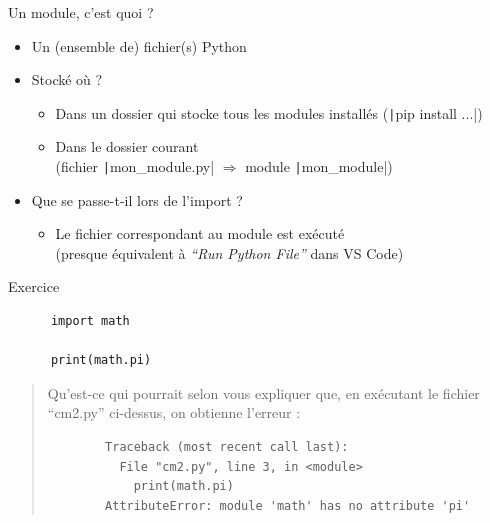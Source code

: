 \documentclass[10pt]{beamer}
\begin{document}
\begin{frame}[fragile]{Un module, c'est quoi ?}
  
  \pause

  \begin{itemize}
    \item Un (ensemble de) fichier(s) Python
    \item Stocké où ?
    \pause
    \begin{itemize}
      \item Dans un dossier qui stocke tous les modules installés (\texttt|pip install ...|)
      \item Dans le dossier courant \\ (fichier \texttt|mon_module.py| $\Rightarrow$ module \texttt|mon_module|)
    \end{itemize}
    \item Que se passe-t-il lors de l'import ?
    \pause
    \begin{itemize}
      \item Le fichier correspondant au module est exécuté \\ (presque équivalent à \emph{``Run Python File''} dans VS Code)
    \end{itemize}
  \end{itemize}
\end{frame}

\begin{frame}[fragile]{Exercice}
  \begin{beamercodeblock}
    \begin{verbatim}
      import math

      print(math.pi)
    \end{verbatim}
  \end{beamercodeblock}

  \bigskip

  \begin{quote}
    Qu'est-ce qui pourrait selon vous expliquer que, en exécutant le fichier ``cm2.py'' ci-dessus, on obtienne l'erreur :

    \begin{beamercodeblock}
      \begin{verbatim}
        Traceback (most recent call last):
          File "cm2.py", line 3, in <module>
            print(math.pi)
        AttributeError: module 'math' has no attribute 'pi'
      \end{verbatim}
    \end{beamercodeblock}
  \end{quote}
\end{frame}
\end{document}
